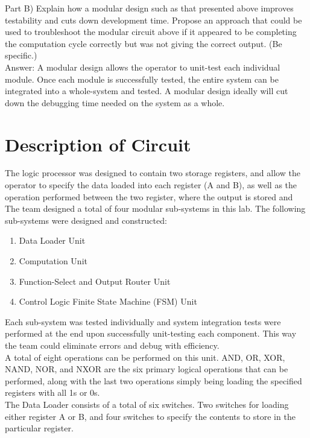 \documentclass[journal, twocolumn, final,11pt,letterpaper]{IEEEtran}
\begin{document}
Part B) Explain how a modular design such as that presented above improves testability and cuts down development time. Propose an approach that could be used to troubleshoot the modular circuit above if it appeared to be completing the computation cycle correctly but was not giving the correct output. (Be specific.)\\

Answer: A modular design allows the operator to unit-test each individual module. Once each module is successfully tested, the entire system can be integrated into a whole-system and tested. A modular design ideally will cut down the debugging time needed on the system as a whole.  


\section{Description of Circuit}
The logic processor was designed to contain two storage registers, and allow the operator to specify the data loaded into each register (A and B), as well as the operation performed between the two register, where the output is stored and 
The team designed a total of four modular sub-systems in this lab. The following sub-systems were designed and constructed:\\
\begin{enumerate}
	\item Data Loader Unit
	\item Computation Unit
	\item Function-Select and Output Router Unit
	\item Control Logic Finite State Machine (FSM) Unit
\end{enumerate}
\vspace{2mm}

Each sub-system was tested individually and system integration tests were performed at the end upon successfully unit-testing each component. This way the team could eliminate errors and debug with efficiency.\\

A total of eight operations can be performed on this unit. AND, OR, XOR, NAND, NOR, and NXOR are the six primary logical operations that can be performed, along with the last two operations simply being loading the specified registers with all 1s or 0s. \\

The Data Loader consists of a total of six switches. Two switches for loading either register A or B, and four switches to specify the contents to store in the particular register.\\
\end{document}
